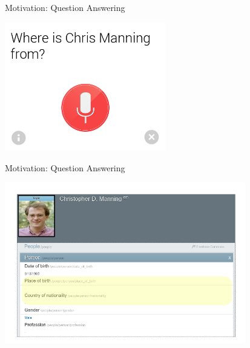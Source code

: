 \def\title{Motivation: Question Answering}
\begin{frame}{\title}
\begin{center}
  \includegraphics[width=7cm]{../../img/google-chris-manning-origin.png}
\end{center}
\end{frame}

\begin{frame}[noframenumbering]{\title}
\vspace{-1cm}
\begin{center}
  \includegraphics[width=10.5cm]{../../img/chris-freebase.png}
\end{center}
\end{frame}

